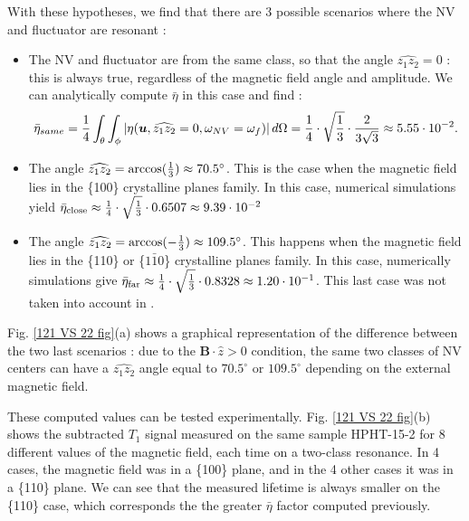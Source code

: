 \documentclass[preprintnumbers,amsmath,amssymb,onecolumn,12pt]{revtex4-2}\usepackage{graphicx}%
\begin{document}
With these hypotheses, we find that there are 3 possible scenarios where the NV and fluctuator are resonant :
\begin{itemize}
\item The NV and fluctuator are from the same class, so that the angle $\widehat{z_1 z_2}=0$ : this is always true, regardless of the magnetic field angle and amplitude. We can analytically compute $\bar \eta$ in this case and find : $$ \bar {\eta}_{same}=\frac{1}{4}  \int_\theta \int_\phi \abs{\eta(\bm u,\widehat{z_1 z_2}=0,\omega_{NV}=\omega_f)}\, d\Omega= \frac{1}{4} \cdot \sqrt{\frac{1}{3}} \cdot \frac{2}{3 \sqrt{3}} \approx 5.55\cdot10^{-2}.$$
\item The angle $\widehat{z_1 z_2}=\rm{arccos}(\frac{1}{3})\approx 70.5^\circ$. This is the case when the magnetic field lies in the \{100\} crystalline planes family. In this case, numerical simulations yield $\bar \eta_{\rm close} \approx \frac{1}{4} \cdot \sqrt{\frac{1}{3}} \cdot 0.6507 \approx 9.39\cdot10^{-2}$
\item The angle $\widehat{z_1 z_2}=\rm{arccos}(-\frac{1}{3})\approx 109.5^\circ$. This happens when the magnetic field lies in the \{110\} or \{$1\bar{1}0$\} crystalline planes family. In this case, numerically simulations give $\bar \eta_{\rm far} \approx \frac{1}{4} \cdot \sqrt{\frac{1}{3}} \cdot 0.8328 \approx 1.20\cdot10^{-1}$. This last case was not taken into account in \cite{choi_depolarization_2017}.
\end{itemize}

Fig. \ref{121 VS 22 fig}(a) shows a graphical representation of the difference between the two last scenarios : due to the $\bm{B}\cdot \hat{z} >0$ condition, the same two classes of NV centers can have a $\widehat{z_1 z_2}$ angle equal to $70.5^\circ$ or $109.5^\circ$ depending on the external magnetic field. 

These computed values can be tested experimentally. Fig. \ref{121 VS 22 fig}(b) shows the subtracted $T_1$ signal measured on the same sample HPHT-15-2 for 8 different values of the magnetic field, each time on a two-class resonance. In 4 cases, the magnetic field was in a \{100\} plane, and in the 4 other cases it was in a \{110\} plane. We can see that the measured lifetime is always smaller on the \{110\} case, which corresponds the the greater $\bar \eta$ factor computed previously.
\end{document}
